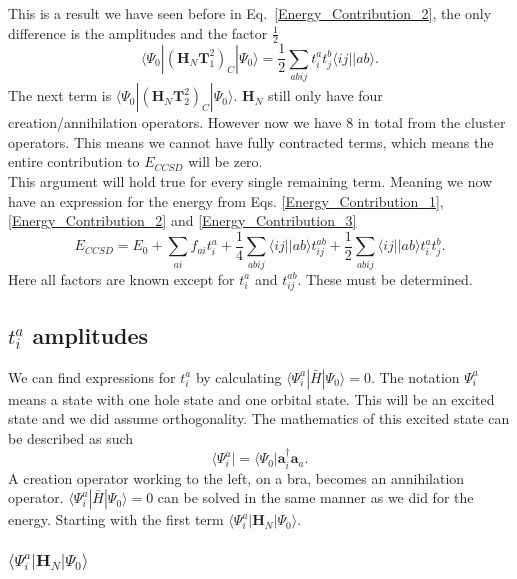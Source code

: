 \documentclass[a4paper,norsk,11pt,twoside]{report}
\begin{document}
This is a result we have seen before in Eq.~\eqref{Energy_Contribution_2}, the only difference is the amplitudes and the factor $\frac{1}{2}$
\begin{equation}
\langle \Psi_0 | (\textbf{H}_N \textbf{T}_1^2)_C | \Psi_0 \rangle = \frac{1}{2} \sum_{abij} t_{i}^{a} t_j^b \langle ij||ab \rangle . \label{Energy_Contribution_3}
\end{equation}
The next term is $\langle \Psi_0 | (\textbf{H}_N \textbf{T}_2^2)_C |
\Psi_0 \rangle$. $\textbf{H}_N$ still only have four
creation/annihilation operators. However now we have 8 in total from
the cluster operators. This means we cannot have fully contracted
terms, which means the entire contribution to $E_{CCSD}$ will be zero. \\

This argument will hold true for every single remaining term. Meaning we now have an expression for the energy from Eqs. \eqref{Energy_Contribution_1}, \eqref{Energy_Contribution_2} and \eqref{Energy_Contribution_3}
\begin{equation}
E_{CCSD} = E_0 + \sum_{ai} f_{ai} t_i^a + \frac{1}{4} \sum_{abij} \langle ij||ab \rangle t_{ij}^{ab} + \frac{1}{2} \sum_{abij} \langle ij || ab \rangle t_i^a t_j^b . \label{CCSD_TOTAL_ENERGY}
\end{equation}
Here all factors are known except for $t_i^a$ and $t_{ij}^{ab}$. These must be determined.

\subsection{$t_i^a$ amplitudes}
We can find expressions for $t_i^a$ by calculating $\langle \Psi_i^a | \bar{H} | \Psi_0 \rangle = 0$. The notation $\Psi_i^a$ means a state with one hole state and one orbital state. This will be an excited state and we did assume orthogonality. The mathematics of this excited state can be described as such
\begin{equation}
\langle \Psi_i^a | = \langle \Psi_0 | \textbf{a}^{\dag}_i \textbf{a}_a . \label{first_excited_stats}
\end{equation}
A creation operator working to the left, on a bra, becomes an
annihilation operator. $\langle \Psi_i^a | \bar{H} | \Psi_0 \rangle =
0$ can be solved in the same manner as we did for the energy. Starting
with the first term $\langle \Psi_i^a | \textbf{H}_N | \Psi_0
\rangle$.

\subsubsection{$\langle \Psi_i^a | \textbf{H}_N | \Psi_0 \rangle$}
\end{document}
